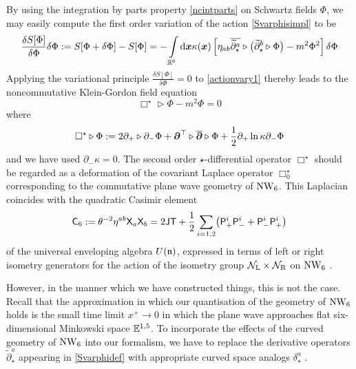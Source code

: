 By using the integration by parts property \eqref{ncintparts} on Schwartz fields
$\Phi$, we may easily compute the first order variation of the action
\eqref{Svarphisimpl} to be
\begin{equation}
  \label{actionvary1}
  \frac{\delta S[\Phi]}{\delta\Phi} \delta\Phi:=
  S[\Phi+\delta\Phi]-S[\Phi]=-\int\limits_{{\mathbb R}^6} {\rm d}{\boldsymbol {x} } 
  \kappa({\boldsymbol {x} }) \left[\eta_{ab} \overline{\widetilde
      {\partial}_\star^{ a}}\triangleright\bigl( \widetilde
    {\partial}_\star^{ b}\triangleright\Phi\bigr)-m^2 \Phi^2
  \right] \delta\Phi
\end{equation}
Applying the variational principle $\frac{\delta S[\Phi]}{\delta\Phi}=0$
to \eqref{actionvary1} thereby leads to the noncommutative Klein-Gordon field
equation
\begin{equation}
  \label{NCeom}
  \Box^\star\triangleright\Phi-m^2 \Phi=0
\end{equation}
where
\begin{equation}
  \label{Boxstardef}
  \Box^\star\triangleright\Phi:=2 \partial_+\triangleright
  \partial_-\Phi+{{\boldsymbol {\partial} }}^\top\triangleright
  \overline{{{\boldsymbol {\partial} }}}\triangleright\Phi+ \frac12  
  \partial_+\ln\kappa \partial_-\Phi
\end{equation}
and we have used $\partial_-\kappa=0$. The second order $\star$-differential
operator $\Box^\star$ should be regarded as a deformation of the covariant
Laplace operator $\Box_0^\star$ corresponding to the commutative plane wave
geometry of $\operatorname{NW}_6$. This Laplacian coincides with the quadratic Casimir element
\begin{equation}
  \label{quadCasimir}
  {\sf C}_6:=\theta^{-2} \eta^{ab} {\sf X}_a {\sf X}_b
  =2 {\sf J} {\sf T}+ \frac12 \sum\limits_{i=1,2}  \bigl(
  {\sf P}_+^i {\sf P}_-^i+{\sf P}_-^i {\sf P}_+^i\bigr)
\end{equation}
of the universal enveloping algebra $U({\mathfrak n})$, expressed in terms of left or
right isometry generators for the action of the isometry group $\mathcal{N}_{\rm
  L}\times\mathcal{N}_{\rm R}$ on $\operatorname{NW}_6$ \cite{PK1,CFS1,Halliday:2005zt}.

However, in the manner which we have constructed things, this is not the case.
Recall that the approximation in which our quantisation of the geometry of
$\operatorname{NW}_6$ holds is the small time limit $x^+\to0$ in which the plane wave
approaches flat six-dimensional Minkowski space ${\mathbb E}^{1,5}$. To incorporate the
effects of the curved geometry of $\operatorname{NW}_6$ into our formalism, we have to replace
the derivative operators $\widetilde{\partial}_\star^{ a}$ appearing in
\eqref{Svarphidef} with appropriate curved space analogs $\delta_\star^a$
\cite{BehrSyk1,HoMiao1}.

